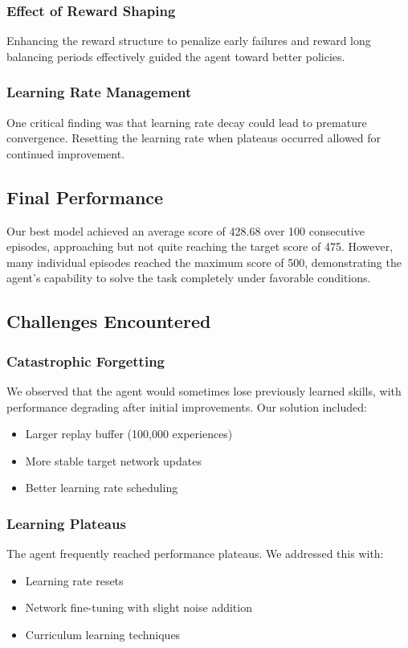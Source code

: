 \documentclass[11pt,a4paper]{article}
\begin{document}
\subsubsection{Effect of Reward Shaping}
Enhancing the reward structure to penalize early failures and reward long balancing periods effectively guided the agent toward better policies.

\subsubsection{Learning Rate Management}
One critical finding was that learning rate decay could lead to premature convergence. Resetting the learning rate when plateaus occurred allowed for continued improvement.

\subsection{Final Performance}

Our best model achieved an average score of 428.68 over 100 consecutive episodes, approaching but not quite reaching the target score of 475. However, many individual episodes reached the maximum score of 500, demonstrating the agent's capability to solve the task completely under favorable conditions.

\subsection{Challenges Encountered}

\subsubsection{Catastrophic Forgetting}
We observed that the agent would sometimes lose previously learned skills, with performance degrading after initial improvements. Our solution included:
\begin{itemize}
    \item Larger replay buffer (100,000 experiences)
    \item More stable target network updates
    \item Better learning rate scheduling
\end{itemize}

\subsubsection{Learning Plateaus}
The agent frequently reached performance plateaus. We addressed this with:
\begin{itemize}
    \item Learning rate resets
    \item Network fine-tuning with slight noise addition
    \item Curriculum learning techniques
\end{itemize}
\end{document}
